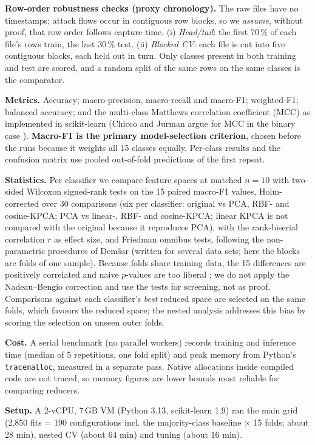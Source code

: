 \documentclass[runningheads]{llncs}
\begin{document}
\textbf{Row-order robustness checks (proxy chronology).} The raw files have no timestamps; attack flows occur in contiguous row blocks, so we \emph{assume}, without proof, that row order follows capture time. (i) \emph{Head/tail}: the first 70\,\% of each file's rows train, the last 30\,\% test. (ii) \emph{Blocked CV}: each file is cut into five contiguous blocks, each held out in turn. Only classes present in both training and test are scored, and a random split of the same rows on the same classes is the comparator.

\textbf{Metrics.} Accuracy; macro-precision, macro-recall and macro-F1; weighted-F1; balanced accuracy; and the multi-class Matthews correlation coefficient (MCC) as implemented in scikit-learn (Chicco and Jurman argue for MCC in the binary case \cite{chicco2020}). \textbf{Macro-F1 is the primary model-selection criterion}, chosen before the runs because it weights all 15 classes equally. Per-class results and the confusion matrix use pooled out-of-fold predictions of the first repeat.

\textbf{Statistics.} Per classifier we compare feature spaces at matched $n=10$ with two-sided Wilcoxon signed-rank tests on the 15 paired macro-F1 values, Holm-corrected over 30 comparisons (six per classifier: original vs PCA, RBF- and cosine-KPCA; PCA vs linear-, RBF- and cosine-KPCA; linear KPCA is not compared with the original because it reproduces PCA), with the rank-biserial correlation $r$ as effect size, and Friedman omnibus tests, following the non-parametric procedures of Dem\v{s}ar \cite{demsar2006} (written for several data sets; here the blocks are folds of one sample). Because folds share training data, the 15 differences are positively correlated and naive $p$-values are too liberal \cite{nadeau2003}; we do not apply the Nadeau--Bengio correction and use the tests for screening, not as proof. Comparisons against each classifier's \emph{best} reduced space are selected on the same folds, which favours the reduced space; the nested analysis addresses this bias by scoring the selection on unseen outer folds.

\textbf{Cost.} A serial benchmark (no parallel workers) records training and inference time (median of 5 repetitions, one fold split) and peak memory from Python's \texttt{tracemalloc}, measured in a separate pass. Native allocations inside compiled code are not traced, so memory figures are lower bounds most reliable for comparing reducers.

\textbf{Setup.} A 2-vCPU, 7\,GB VM (Python 3.13, scikit-learn 1.9) ran the main grid (2{,}850 fits = 190 configurations incl. the majority-class baseline $\times$ 15 folds; about 28 min), nested CV (about 64 min) and tuning (about 16 min).
\end{document}
